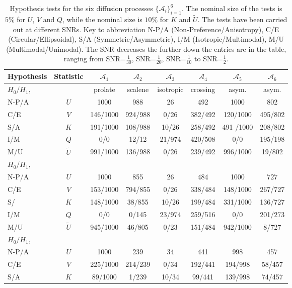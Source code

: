 \documentclass[dvips,aoas,preprint]{imsart}
\numberwithin{equation}{section}
\theoremstyle{plain}
\newcommand{\cA}{\mathcal{A}}
\newcommand{\wt}[1]{\widetilde{#1}}
\begin{document}
{\tiny\begin{table}[!htbp]
  \caption{Hypothesis tests for the six diffusion processes
    $\{\cA_i\}_{i=1}^6$.  The nominal size of the tests is $5\%$ for
    $U$, $V$ and $Q$, while the nominal size is $10\%$ for $K$ and
    $\wt{U}$.  The tests have been carried out at different SNRs. Key to abbreviation N-P/A (Non-Preference/Anisotropy), C/E (Circular/Ellipsoidal), S/A (Symmetric/Asymmetric), I/M (Isotropic/Multimodal), M/U (Multimodal/Unimodal). The SNR decreases the further down the entries are in the table, ranging from SNR=$\frac{1}{30}$, SNR=$\frac{1}{20}$, SNR=$\frac{1}{10}$ to SNR=$\frac{1}{2}$.}
    \begin{tabular}{lccccccc}
      \hline
      Hypothesis & Statistic & $\cA_1$ & $\cA_2$ & $\cA_3$ & $\cA_4$ & $\cA_5$ & $\cA_6$\\ 
\hline
$H_0/H_1,$  & & prolate & scalene & isotropic & crossing & asym. & asym.\\
\hline
N-P/A     & $U$ &  1000 & 988  & 26 & 492 & 1000 & 802\\ 
C/E & $V$ & 146/1000 & 924/988 & 0/26 & 382/492 & 120/1000 & 495/802\\
S/A      & $K$ & 191/1000 & 108/988 & 10/26 & 258/492 & 491 /1000&
      208/802 \\ 
I/M    & $Q$ & 0/0 & 12/12 & 21/974  & 420/508 & 0/0 & 195/198\\ 
M/U       & $\wt{U}$ & 991/1000 & 136/988 & 0/26 & 239/492 &  996/1000 & 19/802\\
      \hline
$H_0/H_1,$  & & & & & & & \\
\hline
N-P/A   & $U$ & 1000 & 855 & 26 & 484 & 1000 & 727\\ 
C/E & $V$ & 153/1000 & 794/855 & 0/26 & 338/484 & 148/1000 & 267/727\\
S/ & $K$ & 148/1000 & 38/855 & 10/26 & 199/484 & 331/1000 & 136/727\\ 
I/M& $Q$ & 0/0 & 0/145 & 23/974  &259/516& 0/0 & 201/273\\ 
M/U & $\wt{U}$ & 945/1000 & 46/805 & 0/23   &   151/484 & 942/1000  & 8/727\\
      \hline
$H_0/H_1,$  & & & & & & & \\
\hline
N-P/A   & $U$ & 1000 & 239 & 34 & 441 & 998 & 457\\ 
C/E & $V$ & 225/1000  & 214/239 & 0/34 & 192/441 & 194/998 & 58/457\\
S/A & $K$ & 89/1000   & 1/239 & 10/34 & 99/441 & 139/998 & 74/457\\ 

\end{tabular}
\end{table}}
\end{document}
